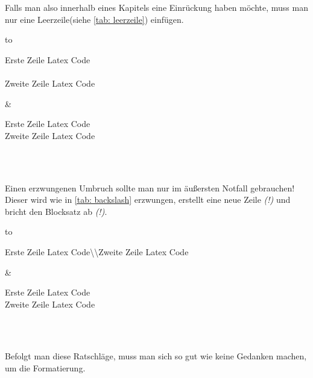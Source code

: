 Falls man also innerhalb eines Kapitels eine Einrückung haben möchte, muss man nur eine Leerzeile(siehe \ref{tab: leerzeile}) einfügen.\\%
\begin{table}[ht]%
\begin{tabu} to \textwidth {X[c]X[c]}%
\toprule%
	\begin{minipage}[t]{0.4\textwidth}%
	Erste Zeile Latex Code\\%
	\\%
	Zweite Zeile Latex Code%
	\end{minipage}%
&%
	\begin{minipage}[t]{0.4\textwidth}%
	Erste Zeile Latex Code\\%
	\hspace*{10.95pt}Zweite Zeile Latex Code%
	\end{minipage}\\%
\bottomrule%
\end{tabu}%
\caption{Einrückung durch Leerzeile}%
\label{tab: leerzeile}%
\end{table}\\%
%
Einen erzwungenen Umbruch sollte man nur im äußersten Notfall gebrauchen! Dieser wird wie in \ref{tab: backslash} erzwungen, erstellt eine neue Zeile \emph{(!)} und bricht den Blocksatz ab \emph{(!)}.\\%
\begin{table}[h]%
\begin{tabu} to \textwidth {X[c]X[c]}%
\toprule%
	\begin{minipage}{0.4\textwidth}%
	Erste Zeile Latex Code\textbackslash \textbackslash Zweite Zeile Latex Code
	\end{minipage}%
&%
	\begin{minipage}{0.4\textwidth}%
	Erste Zeile Latex Code\\%
	\noindent Zweite Zeile Latex Code%
	\end{minipage}\\%
\bottomrule%
\end{tabu}%
\caption{Erzwungener Zeilenumbruch}%
\label{tab: backslash}%
\end{table}\\%
Befolgt man diese Ratschläge, muss man sich so gut wie keine Gedanken machen, um die Formatierung.
%
%
